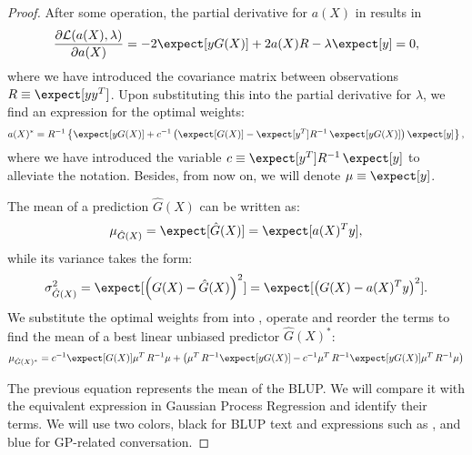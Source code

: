 \begin{proof}
    After some operation, the partial derivative for $a(X)$ in  results in
    \begin{equation*}
        \dfrac{\partial \mathcal{L}(a(X), \lambda)}{\partial a(X)} = -2\expect[yG(X)] + 2a(X)R - \lambda\expect[y] = 0,
    \end{equation*}
    where we have introduced the covariance matrix between observations $R \equiv \expect[yy^T]$. Upon substituting this into the partial derivative for $\lambda$, we find an expression for the optimal weights:
    \begin{equation}
        a(X)^*=R^{-1}\left\{\expect[yG(X)] + c^{-1}\left(\expect[G(X)] - \expect[y^T]R^{-1}\,\expect[yG(X)]\right) \expect[y]\right\},
        \label{eq:optimal_weights}
    \end{equation}
    where we have introduced the variable $c\equiv\expect[y^T]R^{-1}\,\expect[y]$ to alleviate the notation. Besides, from now on, we will denote $\mu \equiv \expect[y]$\sidenotetext[~]{$\mu \equiv \expect[y]$}.

    The mean of a prediction $\hat{G}(X)$ can be written as:
    \begin{equation}
        \mu_{\hat{G}(X)} = \expect [\hat{G}(X)] = \expect[a(X)^Ty],
        \label{eq:mean_blup}
    \end{equation}
    while its variance takes the form:
    \begin{equation}
        \sigma^2_{\hat{G}(X)} = \expect [\left(G(X) - \hat{G}(X)\right)^2] = \expect [\left(G(X) - a(X)^Ty\right)^2].
        \label{eq:var_blup}
    \end{equation}
    We substitute the optimal weights from  into , operate and reorder the terms to find the mean of a best linear unbiased predictor $\hat{G}(X)^*$:
    \begin{equation}
        \mu_{\hat{G}(X)^*} = c^{-1}\expect[G(X)]\mu^T\,R^{-1}\mu + \left(\mu^T\,R^{-1}\expect[yG(X)] - c^{-1} \mu^T\,R^{-1}\expect[yG(X)]\mu^T\,R^{-1}\mu\right)
        \label{eq:mean_blup_long}
    \end{equation}

    The previous equation represents the mean of the BLUP. We will compare it with the equivalent expression in Gaussian Process Regression and identify their terms. We will use two colors, black for BLUP text and expressions such as , and \textcolor{niceBlue}{blue} for GP-related conversation. %


\end{proof}
